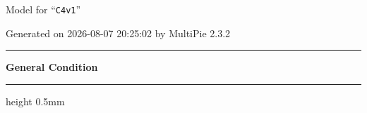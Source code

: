 \documentclass[fleqn,10pt,landscape]{jsarticle}
\begin{document}
\setcounter{MaxMatrixCols}{32}

\renewcommand{\tablename}{Table~}
\renewcommand{\figurename}{Figure~}
\setlength{\baselineskip}{16pt}
\setlength{\parindent}{0pt}
\setlength{\mathindent}{0pt}
\footnotesize
\begin{center}
\LARGE
Model for ``\texttt{C4v1}''
\end{center}
\begin{flushright}
Generated on 2026-08-07 20:25:02 by MultiPie 2.3.2
\end{flushright}
\setlength{\baselineskip}{16pt}
\footnotesize
\vspace{5mm}
\noindent \rule[0.5mm]{5mm}{0.5mm}\hspace{3mm}\textbf{General Condition}\hspace{3mm}\leaders\hrule height 0.5mm\hfill\kern0pt
\vspace{3mm}
\end{document}
